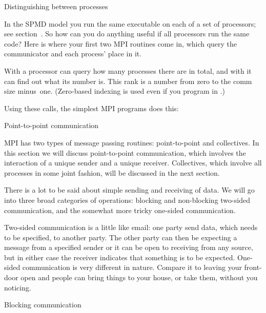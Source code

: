  {Distinguishing between processes}

In the SPMD model you run the same executable on each of a set of
processors; see section~. So how can you do anything
useful if all processors run the same code? Here is where your first
two MPI routines come in,
which query the 
 communicator and each process' place in it.

With  a processor can query how many
processes there are in total, and with  it
can find out what its number is. This rank is a number from zero to
the comm size minus~one. (Zero-based indexing is used even if you
program in .)

Using these calls, the simplest MPI programs does this:

 {Point-to-point communication}

MPI has two types of message passing routines: point-to-point and
collectives. In this section we will discuss point-to-point
communication, which involves the interaction of a unique sender and a
unique receiver. Collectives, which involve all processes in some
joint fashion, will be discussed in the next section.

There is a lot to be said about simple sending and receiving of
data. We will go into three broad categories of operations: blocking
and non-blocking two-sided communication, and the somewhat
more tricky one-sided communication.

Two-sided communication is a little like email: one party send data, 
which needs to be specified, to another party. The other party can then
be expecting a message from a specified sender or it can be open
to receiving from any source, but in either case the receiver
indicates that something is to be expected. 
One-sided communication is very different in nature. Compare it to leaving your
front-door open and people can bring things to your house, or take them,
without you noticing.

 {Blocking communication}

